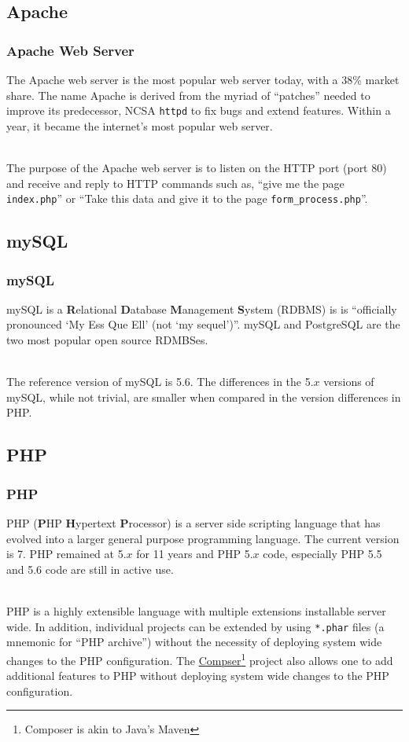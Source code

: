 \documentclass[aspectratio=169]{beamer}
\begin{document}
\subsection{Apache}
\begin{frame}
\frametitle{Apache Web Server}
The Apache web server is the most popular web server today, with a 38\% market share. \cite{netcraft} The name Apache is derived from the myriad of ``patches'' needed to improve its predecessor, NCSA \texttt{httpd} to fix bugs and extend features. Within a year, it became the internet's most popular web server. \cite{apache}

\pause
\mbox{}\\
The purpose of the Apache web server is to listen on the HTTP port (port 80) and receive and reply to HTTP commands such as, ``give me the page \texttt{index.php}'' or ``Take this data and give it to the page \texttt{form\_process.php}''.
\end{frame}

\subsection{mySQL}
\begin{frame}
\frametitle{mySQL}
mySQL is a \textbf{R}elational \textbf{D}atabase \textbf{M}anagement \textbf{S}ystem (RDBMS) is is ``officially pronounced `My Ess Que Ell' (not `my sequel')''. \cite{mysql} mySQL and PostgreSQL are the two most popular open source RDMBSes.

\mbox{}\\
The reference version of mySQL is 5.6. The differences in the 5.$x$ versions of mySQL, while not trivial, are smaller when compared in the version differences in PHP.
\end{frame}

\subsection{PHP}
\begin{frame}
\frametitle{PHP}
PHP (\textbf{P}HP \textbf{H}ypertext \textbf{P}rocessor) is a server side scripting language that has evolved into a larger general purpose programming language. The current version is 7. PHP remained at 5.$x$ for 11 years and PHP 5.$x$ code, especially PHP 5.5 and 5.6 code are still in active use.

\mbox{}\\
PHP is a highly extensible language with multiple extensions installable server wide. In addition, individual projects can be extended by using \texttt{*.phar} files (a mnemonic for ``PHP archive'') without the necessity of deploying system wide changes to the PHP configuration. The \href{https://getcomposer.org/}{Compser}\footnote{Composer is akin to Java's Maven} project also allows one to add additional features to PHP without deploying system wide changes to the PHP configuration.
\end{frame}
\end{document}
